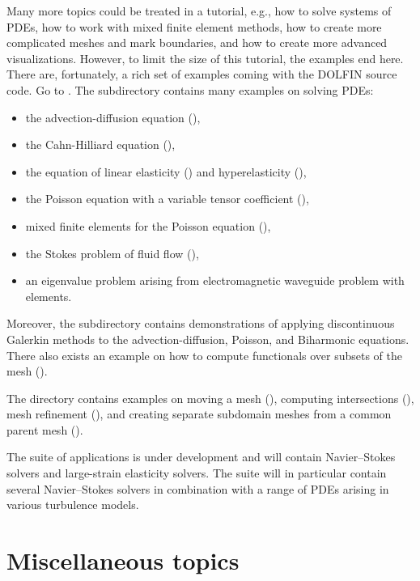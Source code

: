 Many more topics could be treated in a \fenics{} tutorial, e.g., how
to solve systems of PDEs, how to work with mixed finite element
methods, how to create more complicated meshes and mark boundaries,
and how to create more advanced visualizations.  However, to limit the
size of this tutorial, the examples end here.  There are, fortunately,
a rich set of examples coming with the DOLFIN source code. Go to
. The subdirectory
 contains many examples on solving
PDEs:
\begin{itemize}
\item the advection-diffusion equation (),
\item the Cahn-Hilliard equation (),
\item the equation of linear elasticity ()
and hyperelasticity (),
\item the Poisson equation with a variable tensor coefficient
(),
\item mixed finite elements for the Poisson
equation (),
\item the Stokes problem of fluid flow (),
\item an eigenvalue problem arising from electromagnetic
waveguide problem with \nedelec{} elements.
\end{itemize}
Moreover, the  subdirectory contains demonstrations of
applying discontinuous Galerkin methods to
the advection-diffusion, Poisson, and
Biharmonic equations.
There also exists an example on how to compute
functionals over subsets of the mesh ().

The  directory contains examples on moving a mesh
(), computing intersections (),
mesh refinement (), and creating separate subdomain
meshes from a common parent mesh ().

The  suite of applications is under development and
will contain Navier--Stokes solvers and large-strain elasticity
solvers.  The  suite will in particular contain several
Navier--Stokes solvers in combination with a range of PDEs arising in
various turbulence models.

\section{Miscellaneous topics}

